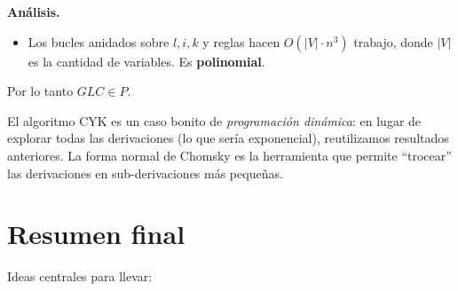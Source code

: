 \documentclass[11pt,a4paper]{article}
\theoremstyle{definicion}
\begin{document}
\textbf{Análisis.}
\begin{itemize}
    \item Los bucles anidados sobre $l, i, k$ y reglas hacen $O(|V| \cdot n^3)$ trabajo, donde $|V|$ es la cantidad de variables. Es \textbf{polinomial}.
\end{itemize}

Por lo tanto $\mathit{GLC} \in P$.

\begin{intuicion}
El algoritmo CYK es un caso bonito de \emph{programación dinámica}: en lugar de explorar todas las derivaciones (lo que sería exponencial), reutilizamos resultados anteriores. La forma normal de Chomsky es la herramienta que permite ``trocear'' las derivaciones en sub-derivaciones más pequeñas.
\end{intuicion}

\section{Resumen final}

Ideas centrales para llevar:
\end{document}
